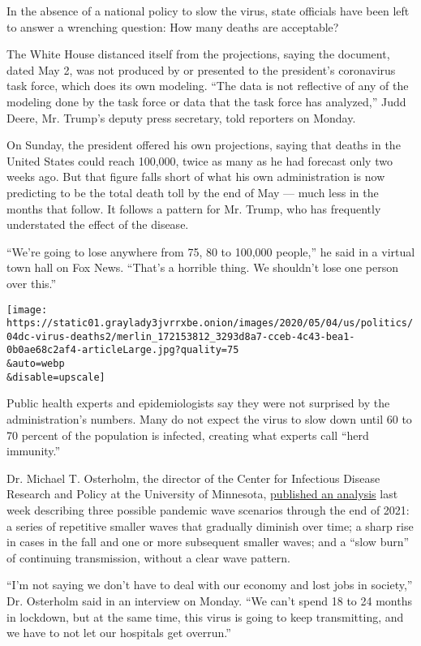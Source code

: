 In the absence of a national policy to slow the virus, state officials
have been left to answer a wrenching question: How many deaths are
acceptable?

The White House distanced itself from the projections, saying the
document, dated May 2, was not produced by or presented to the
president's coronavirus task force, which does its own modeling. ``The
data is not reflective of any of the modeling done by the task force or
data that the task force has analyzed,'' Judd Deere, Mr. Trump's deputy
press secretary, told reporters on Monday.

On Sunday, the president offered his own projections, saying that deaths
in the United States could reach 100,000, twice as many as he had
forecast only two weeks ago. But that figure falls short of what his own
administration is now predicting to be the total death toll by the end
of May --- much less in the months that follow. It follows a pattern for
Mr. Trump, who has frequently understated the effect of the disease.

``We're going to lose anywhere from 75, 80 to 100,000 people,'' he said
in a virtual town hall on Fox News. ``That's a horrible thing. We
shouldn't lose one person over this.''

\texttt{[image: https://static01.graylady3jvrrxbe.onion/images/2020/05/04/us/politics/04dc-virus-deaths2/merlin\_172153812\_3293d8a7-cceb-4c43-bea1-0b0ae68c2af4-articleLarge.jpg?quality=75\\\&auto=webp\\\&disable=upscale]}

Public health experts and epidemiologists say they were not surprised by
the administration's numbers. Many do not expect the virus to slow down
until 60 to 70 percent of the population is infected, creating what
experts call ``herd immunity.''

Dr. Michael T. Osterholm, the director of the Center for Infectious
Disease Research and Policy at the University of Minnesota,
\href{https://www.cidrap.umn.edu/sites/default/files/public/downloads/cidrap-covid19-viewpoint-part1_0.pdf}{published
an analysis} last week describing three possible pandemic wave scenarios
through the end of 2021: a series of repetitive smaller waves that
gradually diminish over time; a sharp rise in cases in the fall and one
or more subsequent smaller waves; and a ``slow burn'' of continuing
transmission, without a clear wave pattern.

``I'm not saying we don't have to deal with our economy and lost jobs in
society,'' Dr. Osterholm said in an interview on Monday. ``We can't
spend 18 to 24 months in lockdown, but at the same time, this virus is
going to keep transmitting, and we have to not let our hospitals get
overrun.''

